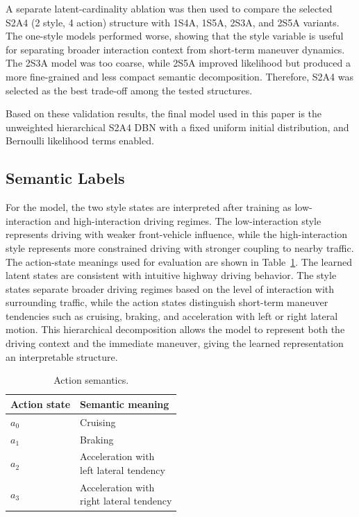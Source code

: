 \documentclass[upint,subscriptcorrection,varvw,hyphenate,balance,greek,russian,vietnamese,german]{asmeconf} %
\begin{document}
A separate latent-cardinality ablation was then used to compare the selected S2A4 (2 style, 4 action) structure with 1S4A, 1S5A, 2S3A, and 2S5A variants. 
The one-style models performed worse, showing that the style variable is useful for separating broader interaction context from 
short-term maneuver dynamics. 
The 2S3A model was too coarse, while 2S5A improved likelihood but produced a more fine-grained and less compact semantic decomposition. 
Therefore, S2A4 was selected as the best trade-off among the tested structures.

Based on these validation results, the final model used in this paper is the unweighted hierarchical S2A4 DBN with a fixed uniform 
initial distribution, and Bernoulli likelihood terms enabled.

\subsection{Semantic Labels}
For the model, the two style states are interpreted after training as low-interaction and high-interaction driving regimes.
The low-interaction style represents driving with weaker front-vehicle influence, while the high-interaction style represents 
more constrained driving with stronger coupling to nearby traffic. 
The action-state meanings used for evaluation are shown in Table~\ref{tab:semantic_action_maps}. 
The learned latent states are consistent with intuitive highway driving behavior. The style states separate broader driving regimes based on the level of 
interaction with surrounding traffic, 
while the action states distinguish short-term maneuver tendencies such as cruising, braking, and acceleration with left or right lateral motion. 
This hierarchical decomposition allows the model to represent both the driving context and the immediate maneuver, giving the learned representation an interpretable structure.

\begin{table}[h]
\centering
\caption{Action semantics.}
\label{tab:semantic_action_maps}
\begin{tabular}{ll}
\toprule
Action state & Semantic meaning \\
\midrule
$a_0$ & Cruising \\
$a_1$ & Braking \\
$a_2$ & \shortstack[l]{Acceleration with\\left lateral tendency} \\
$a_3$ & \shortstack[l]{Acceleration with\\right lateral tendency} \\
\bottomrule
\end{tabular}
\end{table}
\end{document}
